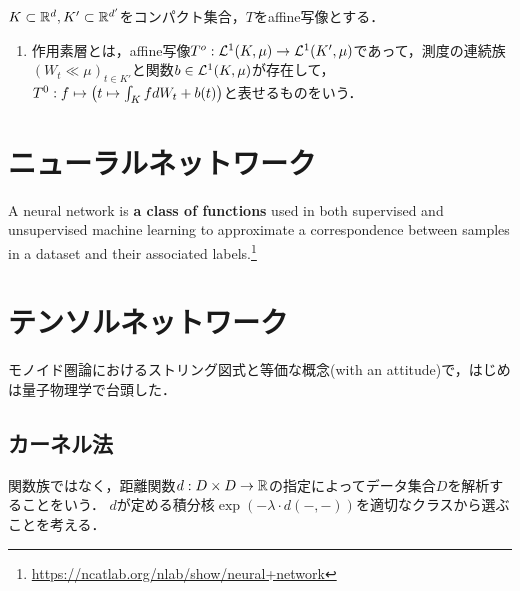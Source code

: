 \documentclass[uplatex,dvipdfmx]{jsreport}
\begin{document}
\begin{definition}
    $K\subset\mathbb{R}^d,K'\subset\mathbb{R}^{d'}$をコンパクト集合，$T$をaffine写像とする．
    \begin{enumerate}
        \item 作用素層とは，affine写像$T^o:\mathcal{L}^1(K,\mu)\to\mathcal{L}^1(K',\mu)$であって，測度の連続族$(W_t\ll\mu)_{t\in K'}$と関数$b\in\mathcal{L}^1(K,\mu)$が存在して，$T^0:f\mapsto\left(t\mapsto\int_KfdW_t+b(t)\right)$と表せるものをいう．
    \end{enumerate}
\end{definition}

\section{ニューラルネットワーク}

\begin{tcolorbox}[colframe=ForestGreen, colback=ForestGreen!10!white,breakable,colbacktitle=ForestGreen!40!white,coltitle=black,fonttitle=\bfseries\sffamily,
title=]
A neural network is \textbf{a class of functions} used in both supervised and unsupervised machine learning to approximate a correspondence between samples in a dataset and their associated labels.\footnote{\url{https://ncatlab.org/nlab/show/neural+network}}
\end{tcolorbox}

\section{テンソルネットワーク}

\begin{tcolorbox}[colframe=ForestGreen, colback=ForestGreen!10!white,breakable,colbacktitle=ForestGreen!40!white,coltitle=black,fonttitle=\bfseries\sffamily,
title=]
    モノイド圏論におけるストリング図式と等価な概念(with an attitude)で，はじめは量子物理学で台頭した．
\end{tcolorbox}

\subsection{カーネル法}

\begin{tcolorbox}[colframe=ForestGreen, colback=ForestGreen!10!white,breakable,colbacktitle=ForestGreen!40!white,coltitle=black,fonttitle=\bfseries\sffamily,
title=]
    関数族ではなく，距離関数$d:D\times D\to\mathbb{R}$の指定によってデータ集合$D$を解析することをいう．
    $d$が定める積分核$\exp(-\lambda\cdot d(-,-))$を適切なクラスから選ぶことを考える．
\end{tcolorbox}
\end{document}
